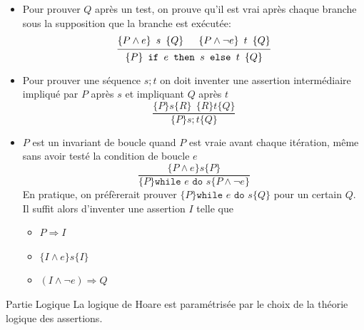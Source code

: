 \documentclass{cours}
\begin{document}
\begin{définition}
\begin{itemize}
\begin{equation*}
\begin{prooftree}
			      \hypo{\{P'\} \texttt{ c } \{Q'\}}
			      \infer3{\{P\} \texttt{ c } \{Q\}}
		      \end{prooftree}
	      \end{equation*}
	      On peut supposer que notre système logique est capable de prouver des formules sur les assertions.
	\item Pour prouver $Q$ après un test, on prouve qu'il est vrai après chaque branche sous la supposition que la branche est exécutée:
	      \begin{equation*}
		      \begin{prooftree}
			      \hypo{\hoare{P\land e}{s}{Q}}
			      \hypo{\hoare{P\land\lnot e}{t}{Q}}
			      \infer2{\hoare{P}{\texttt{if } e \texttt{ then } s \texttt{ else } t}{Q}}
		      \end{prooftree}
	      \end{equation*}
	\item Pour prouver une séquence $s; t$ on doit inventer une assertion intermédiaire impliqué par $P$ après $s$ et impliquant $Q$ après $t$
	      \begin{equation*}
		      \frac{\{P\} s \{R\}\ \ \{R\} t \{Q\}}{\{P\} s; t \{Q\}}
	      \end{equation*}
	\item $P$ est un invariant de boucle quand $P$ est vraie avant chaque itération, même sans avoir testé la condition de boucle $e$
	      \begin{equation*}
		      \frac{\{P \land e\} s \{P\}}{\{P\} \texttt{while } e \texttt{ do } s \{P \land \lnot e\}}
	      \end{equation*}
	      En pratique, on préfèrerait prouver $\{P\} \texttt{while } e \texttt{ do } s \{Q\}$ pour un certain $Q$. Il suffit alors d'inventer une assertion $I$ telle que
	      \begin{itemize}
		      \item $P \Rightarrow I$
		      \item $\{I \land e\} s \{I\}$
		      \item $(I \land \lnot e) \Rightarrow Q$
	      \end{itemize}

\end{itemize}
\end{définition}

\begin{définition}
{Partie Logique}{}
La logique de Hoare est paramétrisée par le choix de la théorie logique des assertions.
\end{définition}
\end{document}
